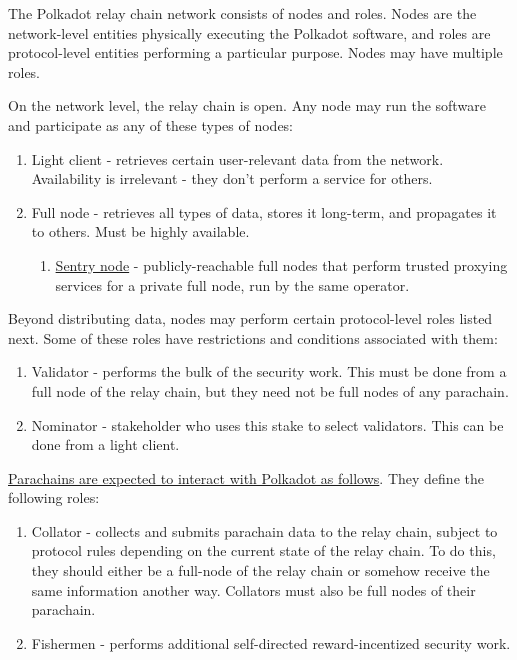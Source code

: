 The Polkadot relay chain network consists of nodes and roles. Nodes are the network-level entities physically executing the Polkadot software, and roles are protocol-level entities performing a particular purpose. Nodes may have multiple roles.

On the network level, the relay chain is open. Any node may run the software and participate as any of these types of nodes:

\begin{enumerate}
\item Light client - retrieves certain user-relevant data from the network. Availability is irrelevant - they don't perform a service for others.
\item Full node - retrieves all types of data, stores it long-term, and propagates it to others. Must be highly available.
  \begin{enumerate}
  \item \hyperref[sec:net_sentry]{Sentry node} - publicly-reachable full nodes that perform trusted proxying services for a private full node, run by the same operator.
  \end{enumerate}
\end{enumerate}

Beyond distributing data, nodes may perform certain protocol-level roles listed next. Some of these roles have restrictions and conditions associated with them:

\begin{enumerate}
\item Validator - performs the bulk of the security work. This must be done from a full node of the relay chain, but they need not be full nodes of any parachain.
\item Nominator - stakeholder who uses this stake to select validators. This can be done from a light client.
\end{enumerate}

\uline{Parachains are expected to interact with Polkadot as follows}. They define the following roles:

\begin{enumerate}
\item Collator - collects and submits parachain data to the relay chain, subject to protocol rules depending on the current state of the relay chain. To do this, they should either be a full-node of the relay chain or somehow receive the same information another way. Collators must also be full nodes of their parachain.
\item Fishermen - performs additional self-directed reward-incentized security work.
\end{enumerate}

